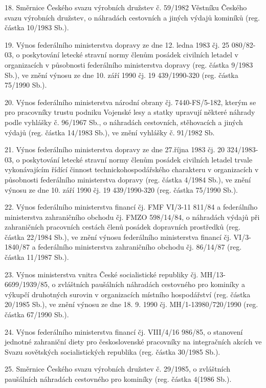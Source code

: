 \documentclass[11pt,a4paper]{article}
\begin{document}
18. Směrnice Českého svazu výrobních družstev č. 59/1982 Věstníku Českého svazu výrobních družstev, o náhradách cestovních a jiných výdajů kominíků (reg. částka 10/1983 Sb.).

19. Výnos federálního ministerstva dopravy ze dne 12. ledna 1983 čj. 25 080/82-03, o poskytování letecké stravní normy členům posádek civilních letadel v organizacích v působnosti federálního ministerstva dopravy (reg. částka 9/1983 Sb.), ve znění výnosu ze dne 10. září 1990 čj. 19 439/1990-320 (reg. částka 75/1990 Sb.).

20. Výnos federálního ministerstva národní obrany čj. 7440-FS/5-182, kterým se pro pracovníky trustu podniku Vojenské lesy a statky upravují některé náhrady podle vyhlášky č. 96/1967 Sb., o náhradách cestovních, stěhovacích a jiných výdajů (reg. částka 14/1983 Sb.), ve znění vyhlášky č. 91/1982 Sb.

21. Výnos federálního ministerstva dopravy ze dne 27.října 1983 čj. 20 324/1983-03, o poskytování letecké stravní normy členům posádek civilních letadel trvale vykonávajícím řídící činnost technickohospodářského charakteru v organizacích v působnosti federálního ministerstva dopravy (reg. částka 4/1984 Sb.), ve znění výnosu ze dne 10. září 1990 čj. 19 439/1990-320 (reg. částka 75/1990 Sb.).

22. Výnos federálního ministerstva financí čj. FMF VI/3-11 811/84 a federálního ministerstva zahraničního obchodu čj. FMZO 598/14/84, o náhradách výdajů při zahraničních pracovních cestách členů posádek dopravních prostředků (reg. částka 22/1984 Sb.), ve znění výnosu federálního ministerstva financí čj. VI/3-1840/87 a federálního ministerstva zahraničního obchodu čj. 86/14/87 (reg. částka 11/1987 Sb.).

23. Výnos ministerstva vnitra České socialistické republiky čj. MH/13-6699/1939/85, o zvláštních paušálních náhradách cestovného pro kominíky a výkupčí druhotných surovin v organizacích místního hospodářství (reg. částka 20/1985 Sb.), ve znění výnosu ze dne 18. 9. 1990 čj. MH/1-13980/720/1990 (reg. částka 67/1990 Sb.).

24. Výnos federálního ministerstva financí čj. VIII/4/16 986/85, o stanovení jednotné zahraniční diety pro československé pracovníky na integračních akcích ve Svazu sovětských socialistických republika (reg. částka 30/1985 Sb.).

25. Směrnice Českého svazu výrobních družstev č. 29/1985, o zvláštních paušálních náhradách cestovného pro kominíky (reg. částka 4(1986 Sb.).
\end{document}
